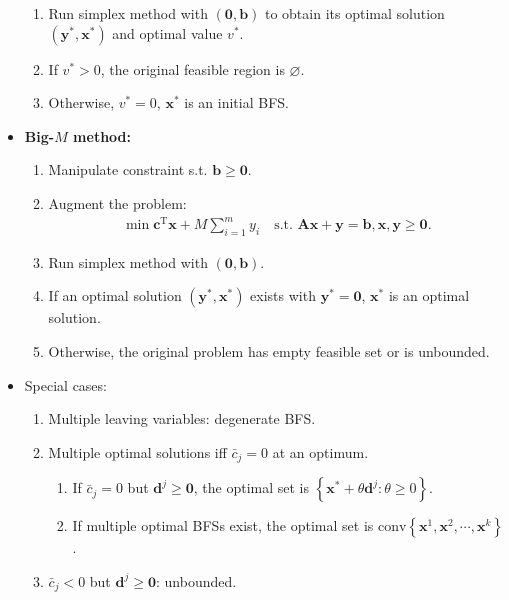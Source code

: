 \documentclass[10pt]{article}
\begin{document}
\begin{multicols*}{3}
\begin{itemize}
\begin{enumerate}
                \item Run simplex method with $(\mathbf{0}, \bm{b})$ to obtain its optimal solution $\left(\bm{y}^*, \bm{x}^*\right)$ and optimal value $v^*$.
                \item If $v^* > 0$, the original feasible region is $\varnothing$.
                \item Otherwise, $v^* = 0$, $\bm{x}^*$ is an initial BFS.
            \end{enumerate} 
            \item \textbf{Big-$M$ method:}
            \begin{enumerate}
                \item Manipulate constraint s.t. $\bm{b} \geq \mathbf{0}$.
                \item Augment the problem:
                \begin{align*}
                    \min \bm{c}^{\mathrm{T}}\bm{x} + M\sum_{i = 1}^{m}y_i \quad \textrm{s.t. } \bm{Ax + y = b}, \bm{x}, \bm{y} \geq \mathbf{0}.
                \end{align*}
                \item Run simplex method with $(\mathbf{0}, \bm{b})$.
                \item If an optimal solution $\left(\bm{y}^*, \bm{x}^*\right)$ exists with $\bm{y}^* = \mathbf{0}$, $\bm{x}^*$ is an optimal solution.
                \item Otherwise, the original problem has empty feasible set or is unbounded.
            \end{enumerate}
            \item Special cases:
            \begin{enumerate}
                \item Multiple leaving variables: degenerate BFS.
                \item Multiple optimal solutions iff $\bar{c}_j = 0$ at an optimum.
                \begin{enumerate}
                    \item If $\bar{c}_j = 0$ but $\bm{d}^j \geq \mathbf{0}$, the optimal set is $\left\{\bm{x}^* + \theta\bm{d}^j \colon \theta \geq 0\right\}$.
                    \item If multiple optimal BFSs exist, the optimal set is $\mathrm{conv}\left\{\bm{x}^1, \bm{x}^2, \cdots, \bm{x}^k\right\}$.
                \end{enumerate}
                \item $\bar{c}_j < 0$ but $\bm{d}^j \geq \mathbf{0}$: unbounded.

\end{enumerate}
\end{itemize}
\end{multicols*}
\end{document}

